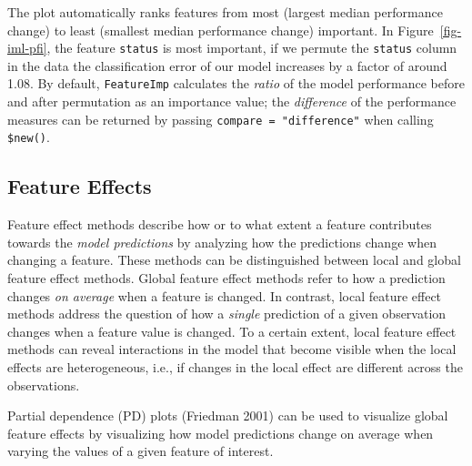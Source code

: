 The plot automatically ranks features from most (largest median
performance change) to least (smallest median performance change)
important. In Figure~\ref{fig-iml-pfi}, the feature \texttt{status} is
most important, if we permute the \texttt{status} column in the data the
classification error of our model increases by a factor of around 1.08.
By default, \texttt{FeatureImp} calculates the \emph{ratio} of the model
performance before and after permutation as an importance value; the
\emph{difference} of the performance measures can be returned by passing
\texttt{compare\ =\ "difference"} when calling \texttt{\$new()}.

\hypertarget{sec-feature-effects}{%
\subsection{Feature Effects}\label{sec-feature-effects}}

Feature effect methods describe how or to what
extent a feature contributes towards the \emph{model predictions} by
analyzing how the predictions change when changing a feature. These
methods can be distinguished between local and global feature effect
methods. Global feature effect methods refer to how a prediction changes
\emph{on average} when a feature is changed. In contrast, local feature
effect methods address the question of how a \emph{single} prediction of
a given observation changes when a feature value is changed. To a
certain extent, local feature effect methods can reveal interactions in
the model that become visible when the local effects are heterogeneous,
i.e., if changes in the local effect are different across the
observations.

Partial
dependence (PD) plots (Friedman 2001) can be used to
visualize global feature effects by visualizing how model predictions
change on average when varying the values of a given feature of
interest.

